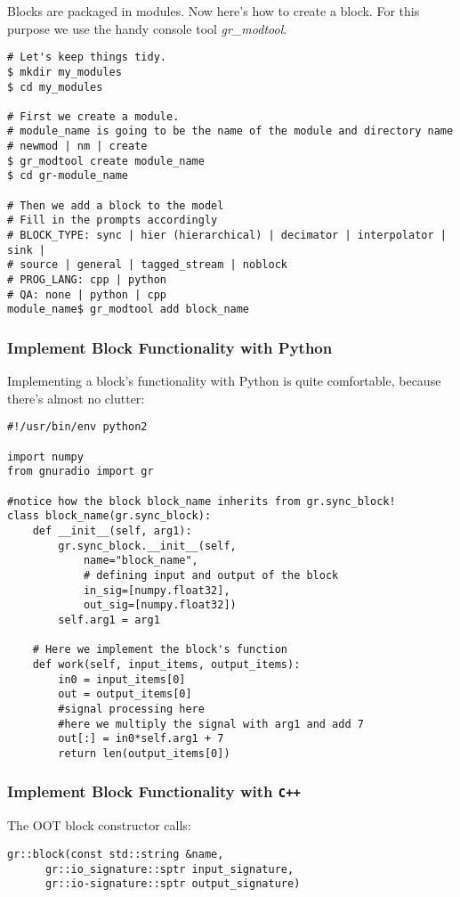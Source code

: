 \documentclass{article}
\begin{document}
Blocks are packaged in modules. Now here's how to create a block. For this purpose we use the handy console tool \emph{gr\_modtool}.

\begin{verbatim}
# Let's keep things tidy.
$ mkdir my_modules
$ cd my_modules

# First we create a module.
# module_name is going to be the name of the module and directory name
# newmod | nm | create
$ gr_modtool create module_name
$ cd gr-module_name

# Then we add a block to the model
# Fill in the prompts accordingly
# BLOCK_TYPE: sync | hier (hierarchical) | decimator | interpolator | sink | 
# source | general | tagged_stream | noblock 
# PROG_LANG: cpp | python
# QA: none | python | cpp
module_name$ gr_modtool add block_name
\end{verbatim}

\subsubsection{Implement Block Functionality with Python}

Implementing a block's functionality with Python is quite comfortable, because there's almost no clutter:

\begin{verbatim}
#!/usr/bin/env python2

import numpy
from gnuradio import gr

#notice how the block block_name inherits from gr.sync_block!
class block_name(gr.sync_block):
	def __init__(self, arg1):
		gr.sync_block.__init__(self,
			name="block_name",
			# defining input and output of the block
			in_sig=[numpy.float32],
			out_sig=[numpy.float32])
		self.arg1 = arg1
	
	# Here we implement the block's function
	def work(self, input_items, output_items):
		in0 = input_items[0]
		out = output_items[0]
		#signal processing here
		#here we multiply the signal with arg1 and add 7
		out[:] = in0*self.arg1 + 7
		return len(output_items[0])
\end{verbatim}

\subsubsection{Implement Block Functionality with \texttt{C++}}

The OOT block constructor calls:

\begin{verbatim}
gr::block(const std::string &name, 
	  gr::io_signature::sptr input_signature,
	  gr::io-signature::sptr output_signature)
\end{verbatim}
\end{document}
